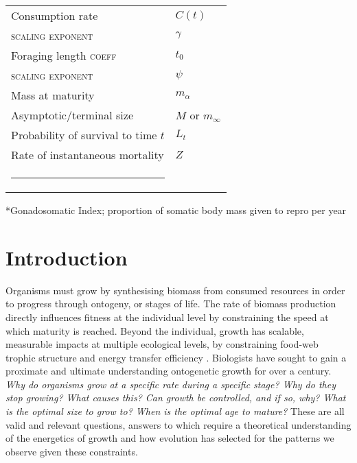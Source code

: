\documentclass[a4paper]{article} %
\makeatletter
\newcommand{\thickhline}{%
    \noalign {\ifnum 0=`}\fi \hrule height 1pt
    \futurelet \reserved@a \@xhline
}
\makeatother
\begin{document}
\begin{table}[h]
\begin{tabularx}{0.7\linewidth}{ll}
    Consumption rate                                                    & $C(t)$                \\ 
    \textsc{scaling exponent}                                           & $\gamma$              \\ \hline
    Foraging length \textsc{coeff}                                      & $t_0$                 \\
    \textsc{scaling exponent}                                           & $\psi$                \\ \hline
    Mass at maturity                                                    & $m_{\alpha}$          \\ \hline
    Asymptotic/terminal size                                            & $M$ or $m_{\infty}$   \\ \hline
    Probability of survival to time $t$                                 & $L_t$                 \\ \hline
    Rate of instantaneous mortality                                     & $Z$                   \\ \thickhline
    \end{tabularx}
\end{table}

*Gonadosomatic Index; proportion of somatic body mass given to repro per year

\newpage
\section{Introduction}\thispagestyle{plain}
    Organisms must grow by synthesising biomass from consumed resources in order to progress through ontogeny, or stages of life. The rate of biomass production directly influences fitness at the individual level by constraining the speed at which maturity is reached. Beyond the individual, growth has scalable, measurable impacts at multiple ecological levels, by constraining food-web trophic structure and energy transfer efficiency \autocite{Barneche2018}. Biologists have sought to gain a proximate and ultimate understanding ontogenetic growth for over a century. \textit{Why do organisms grow at a specific rate during a specific stage? Why do they stop growing? What causes this? Can growth be controlled, and if so, why? What is the optimal size to grow to? When is the optimal age to mature?} These are all valid and relevant questions, answers to which require a theoretical understanding of the energetics of growth and how evolution has selected for the patterns we observe given these constraints. 
    
\end{document}
